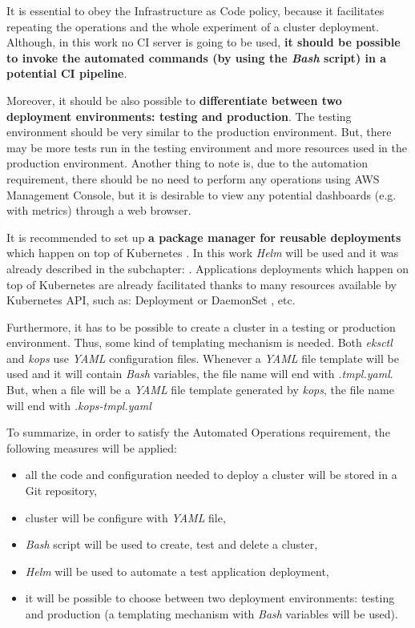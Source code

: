 It is essential to obey the Infrastructure as Code policy, because it facilitates repeating the operations and the whole experiment of a cluster deployment. Although, in this work no CI server is going to be used, \textbf{it should be possible to invoke the automated commands (by using the \textit{Bash} script) in a potential CI pipeline}.

Moreover, it should be also possible to \textbf{differentiate between two deployment environments: testing and production}. The testing environment should be very similar to the production environment. But, there may be more tests run in the testing environment and more resources used in the production environment. Another thing to note is, due to the automation requirement, there should be no need to perform any operations using AWS Management Console, but it is desirable to view any potential dashboards (e.g. with metrics) through a web browser.

It is recommended to set up \textbf{a package manager for reusable deployments} which happen on top of Kubernetes \cite{gruntwork-howto-blog}. In this work \textit{Helm} will be used and it was already described in the subchapter: . Applications deployments which happen on top of Kubernetes are already facilitated thanks to many resources available by Kubernetes API, such as: Deployment \cite{k8s-resources-depl} or DaemonSet \cite{k8s-resources-ds}, etc.

Furthermore, it has to be possible to create a cluster in a testing or production environment. Thus, some kind of templating mechanism is needed. Both \textit{eksctl} and \textit{kops} use \textit{YAML} configuration files. Whenever a \textit{YAML} file template will be used and it will contain \textit{Bash} variables, the file name will end with \textit{.tmpl.yaml}. But, when a file will be a \textit{YAML} file template generated by \textit{kops}, the file name will end with \textit{.kops-tmpl.yaml}

To summarize, in order to satisfy the Automated Operations requirement, the following measures will be applied:
\begin{itemize}
\item all the code and configuration needed to deploy a cluster will be stored in a Git repository,
\item cluster will be configure with \textit{YAML} file,
\item \textit{Bash} script will be used to create, test and delete a cluster,
\item \textit{Helm} will be used to automate a test application deployment,
\item it will be possible to choose between two deployment environments: testing and production (a templating mechanism with \textit{Bash} variables will be used).
\end{itemize}


